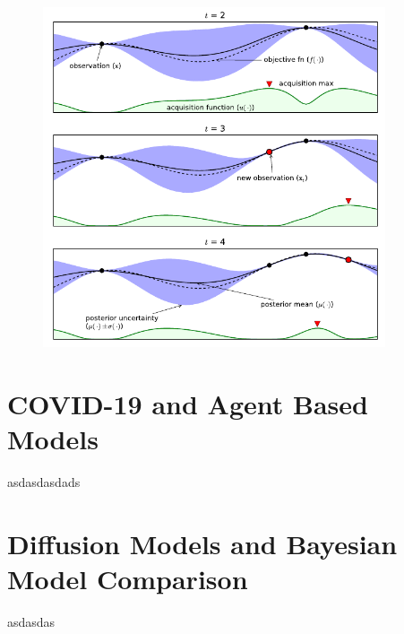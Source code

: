 \begin{figure}[htbp]
    \centering
    \includegraphics[width=0.9\textwidth]{figures/MasterThesis-hpo-bayesian}
\end{figure}

\section{COVID-19 and Agent Based Models}
\label{section:agent-based-models}
asdasdasdads

\section{Diffusion Models and Bayesian Model Comparison}
\label{section:diffusion}
asdasdas
